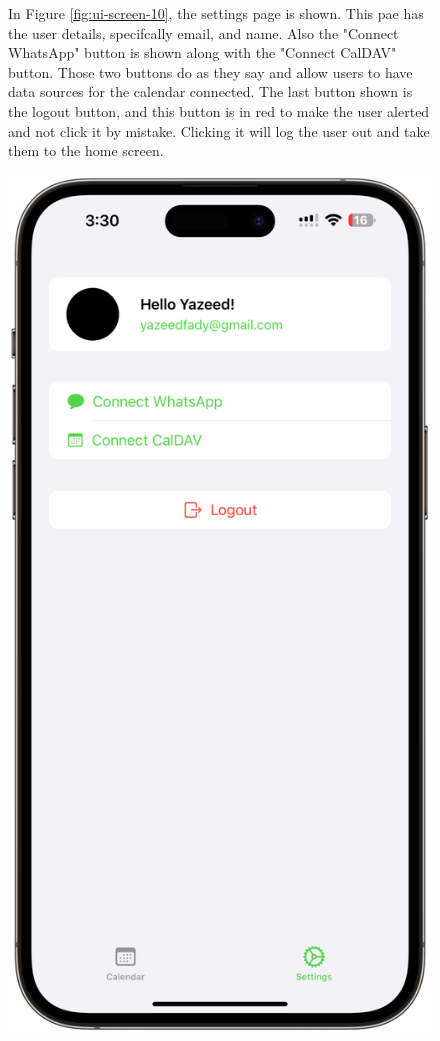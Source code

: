 \begin{figure}[!h]
    \begin{minipage}{0.65\textwidth}
        In Figure \ref{fig:ui-screen-10}, the settings page is shown. This pae has the user details, specifcally email, and name. Also the "Connect WhatsApp" button is shown along with the "Connect CalDAV" button. Those two buttons do as they say and allow users to have data sources for the calendar connected. The last button shown is the logout button, and this button is in red to make the user alerted and not click it by mistake. Clicking it will log the user out and take them to the home screen.
    \end{minipage}
    \hfill
    \begin{minipage}{0.3\textwidth}
        \centering
        \includegraphics[width=\textwidth]{images/screen10.png}

\end{minipage}
\end{figure}
